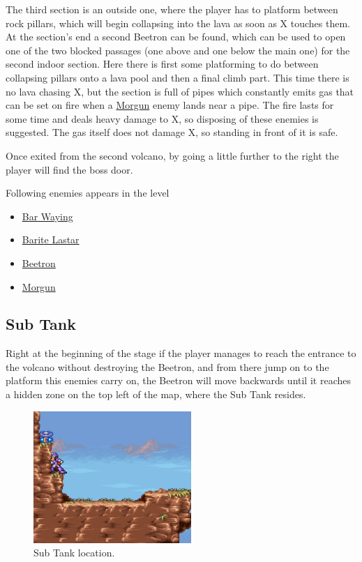The third section is an outside one, where the player has to platform between rock pillars, which will begin collapsing into the lava as soon as X touches them. At the section's end a second Beetron can be found, which can be used to open one of the two blocked passages (one above and one below the main one) for the second indoor section. Here there is first some platforming to do between collapsing pillars onto a lava pool and then a final climb part. This time there is no lava chasing X,  but the section is full of pipes which constantly emits gas that can be set on fire when a \hyperlink{enem:Morgun}{Morgun} enemy lands near a pipe. The fire lasts for some time and deals heavy damage to X, so disposing of these enemies is suggested. The gas itself does not damage X, so standing in front of it is safe.

Once exited from the second volcano, by going a little further to the right the player will find the boss door.

Following enemies appears in the level~\cite{wiki:Volcanic_zone}
\begin{itemize}
	\item \hyperlink{enem:Bar_Waying}{Bar Waying}
	\item \hyperlink{enem:Barite_Lastar}{Barite Lastar}
	\item \hyperlink{enem:Beetron}{Beetron}
	\item \hyperlink{enem:Morgun}{Morgun}
\end{itemize}


\subsection{Sub Tank}
Right at the beginning of the stage if the player manages to reach the entrance to the volcano without destroying the Beetron, and from there jump on to the platform this enemies carry on, the Beetron will move backwards until it reaches a hidden zone on the top left of the map, where the Sub Tank resides. 
\begin{figure}[htp]
	\centering
	\includegraphics[height=5cm]{figures/X2/Flame_stag/Stag_tank.png}
	\caption{Sub Tank location.}
\end{figure}


